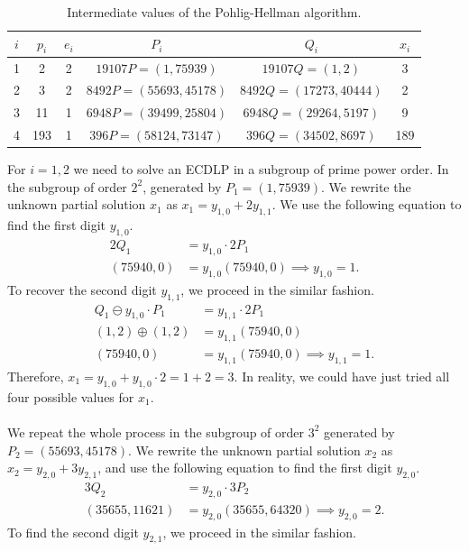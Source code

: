 \documentclass[thesis=M,english]{FITthesis}[2012/10/20]
\theoremstyle{remark}
\theoremstyle{definition}
\begin{document}
\begin{table}[H]
\centering
\begin{tabular}{ |c||c|c|c|c|c| } 
\hline
 $i$ & $p_i$ & $e_i$ & $P_i$ & $Q_i$ & $x_i$  \\
\hline
\hline
1 & 2 & 2 & $19107P = (1, 75939)$ &  $19107Q = (1,2)$ & 3  \\ \hline
2 & 3 & 2 & $8492P = (55693, 45178)$ &  $8492Q = (17273,40444)$ & 2 \\ \hline
3 & 11 & 1 & $6948P = (39499, 25804)$ &  $6948Q = (29264,5197)$ & 9 \\  \hline
4 & 193 & 1 & $396P = (58124, 73147)$ &  $396Q = (34502,8697)$ & 189 \\ \hline
\end{tabular}
\caption[Intermediate values of the Pohlig-Hellman algorithm]{Intermediate values of the Pohlig-Hellman algorithm.}
\label{tblPH}
\end{table}
\noindent For $i=1,2$ we need to solve an ECDLP in a subgroup of prime power order. In the subgroup of order $2^2$, generated by $P_1 = (1, 75939)$. We rewrite the unknown partial solution $x_1$ as $x_1 = y_{1,0} + 2y_{1,1}$. We use the following equation to find the first digit $y_{1,0}$.
\begin{align*}
2Q_1 &= y_{1,0}\cdot2P_1 \\
(75940, 0) &= y_{1,0}(75940, 0) \implies y_{1,0} = 1.
\end{align*}
To recover the second digit $y_{1,1}$, we proceed in the similar fashion.
\begin{align*}
Q_1 \ominus y_{1,0}\cdot P_1 &= y_{1,1}\cdot 2P_1 \\
(1,2) \oplus (1,2) & = y_{1,1}(75940, 0) \\
(75940, 0) &= y_{1,1}(75940, 0) \implies y_{1,1} = 1.
\end{align*}
Therefore, $x_1 = y_{1,0} + y_{1,0}\cdot 2 = 1 + 2 = 3.$ In reality, we could have just tried all four possible values for $x_1$. \\ \\
\noindent We repeat the whole process in the subgroup of order $3^2$ generated by $P_2 = (55693, 45178)$. We rewrite the unknown partial solution $x_2$ as $x_2 = y_{2,0} + 3y_{2,1}$, and use the following equation to find the first digit $y_{2,0}$.
\begin{align*}
3Q_2 &= y_{2,0}\cdot 3P_2 \\
(35655, 11621) &= y_{2,0}(35655, 64320) \implies y_{2,0} = 2.
\end{align*}
To find the second digit $y_{2,1}$, we proceed in the similar fashion.
\end{document}
